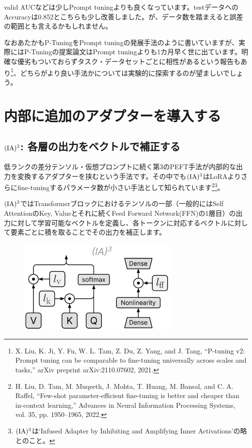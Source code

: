 \documentclass[a5paper,twoside,dvipdfmx]{jsarticle}
\begin{document}
valid AUCなどは少しPrompt tuningよりも良くなっています。testデータへのAccuracyは0.852とこちらも少し改善しました。が、データ数を踏まえると誤差の範囲とも言えるかもしれません。

なおあたかもP-TuningをPrompt tuningの発展手法のように書いていますが、実際にはP-Tuningの提案論文はPrompt tuningよりも1カ月早く世に出ています。明確な優劣もついておらずタスク・データセットごとに相性があるという報告もあり\footnote{X. Liu, K. Ji, Y. Fu, W. L. Tam, Z. Du, Z. Yang, and J. Tang, “P-tuning v2: Prompt tuning can be comparable to fine-tuning universally across scales and tasks,” arXiv preprint arXiv:2110.07602, 2021.}、どちらがより良い手法かについては実験的に探索するのが望ましいでしょう。

\newpage

\section{内部に追加のアダプターを導入する}

\subsection{$\rm{(IA)^3}$: 各層の出力をベクトルで補正する}

低ランクの差分テンソル・仮想プロンプトに続く第3のPEFT手法が内部的な出力を変換するアダプターを挟むという手法です。その中でも$\rm{(IA)^3}$はLoRAよりさらにfine-tuningするパラメータ数が小さい手法として知られています\footnote{H. Liu, D. Tam, M. Muqeeth, J. Mohta, T. Huang, M. Bansal, and C. A. Raffel, “Few-shot parameter-efficient fine-tuning is better and cheaper than in-context learning,” Advances in Neural Information Processing Systems, vol. 35, pp. 1950–1965, 2022.}\footnote{$\rm{(IA)^3}$は`Infused Adapter by Inhibiting and Amplifying Inner Activations'の略とのこと。}。

$\rm{(IA)^3}$ではTransformerブロックにおけるテンソルの一部（一般的にはSelf AttentionのKey, Valueとそれに続くFeed Forward Network(FFN)の1層目）の出力に対して学習可能なベクトルを定義し、各トークンに対応するベクトルに対して要素ごとに積を取ることでその出力を補正します。


\begin{figure}[h]
  \centering
  \includegraphics[width=80mm]{../C105Fig/gray/ia3_image.png}
 \end{figure} 
\end{document}
